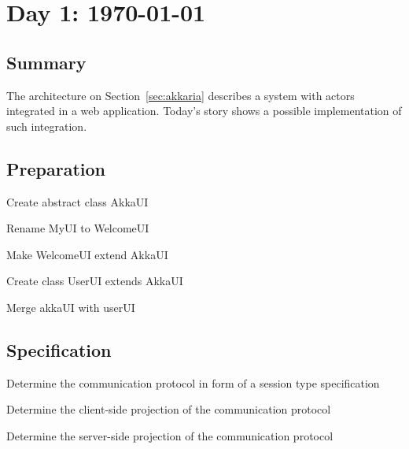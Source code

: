 
\section{Day 1:  \today}
\label{sec:day-1}


\subsection{Summary}
\label{sec:overview1}
 The architecture on Section~\ref{sec:akkaria} describes a system with
\akka actors integrated in a \vaadin web application.
%
Today's story shows a possible implementation of such
integration.
  
\subsection{Preparation}
\label{sec:preparation}

\begin{task}
Create abstract class AkkaUI\\
\end{task}
\begin{task}
  Rename MyUI to WelcomeUI\\
\end{task}
\begin{task}
  Make WelcomeUI extend AkkaUI\\
\end{task}
\begin{task}
  Create class UserUI extends AkkaUI\\
\end{task}
\begin{task}
  Merge akkaUI with userUI\\
\end{task}
%

\subsection{Specification}
\label{sec:specification}

\begin{task}
  Determine the communication protocol in form of a session type
  specification\\
\end{task}
\begin{task}
  Determine the client-side projection of the communication
  protocol\\
\end{task}
\begin{task}
  Determine the server-side projection of the communication
  protocol\\
\end{task}
%

